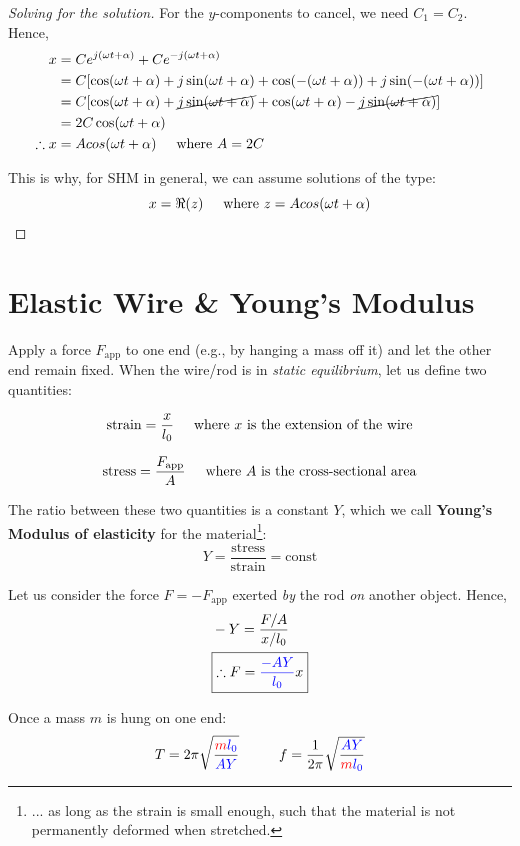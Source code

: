 \documentclass[11pt,letterpaper,titlepage,oneside]{book}
\newcommand{\htab}{\hspace{0.5cm}}
\newcommand{\where}{\htab\text{where }}
\begin{document}
\begin{proof}[Solving for the solution]
For the $y$-components to cancel, we need $C_1=C_2$. Hence,
\begin{align*}
x
&=Ce^{j(\omega t +\alpha)} + Ce^{-j(\omega t +\alpha)} \\
&=C[\cos(\omega t + \alpha) + j\sin(\omega t + \alpha) + \cos(-(\omega t + \alpha)) + j\sin(-(\omega t + \alpha))] \\
&=C[\cos(\omega t + \alpha) + \cancel{j\sin(\omega t + \alpha)} + \cos(\omega t + \alpha) - \cancel{j\sin(\omega t + \alpha)}] \\
&= 2C\cos(\omega t + \alpha) \\
\therefore
x &= Acos(\omega t + \alpha) \where A=2C
\end{align*}

This is why, for SHM in general, we can assume solutions of the type:
\begin{equation}
	x=\Re(z) \where z=Acos(\omega t + \alpha)
\end{equation}
\end{proof}


\section{Elastic Wire \& Young's Modulus}

Apply a force $F_\text{app}$ to one end (e.g., by hanging a mass off it) and let the other end remain fixed. When the wire/rod is in \textit{static equilibrium}, let us define two quantities:

\[  \text{strain} = \frac{x}{l_0} \where\text{$x$ is the extension of the wire}  \]

\[ \text{stress} = \frac{F_\text{app}}{A} \where\text{$A$ is the cross-sectional area} \]

The ratio between these two quantities is a constant $Y$, which we call \textbf{Young's Modulus of elasticity} for the material\footnote{... as long as the strain is small enough, such that the material is not permanently deformed when stretched.}:
\[\boxed{ Y = \frac{\text{stress}}{\text{strain}} = \text{const} } \]

Let us consider the force $F = -F_\text{app}$ exerted \emph{by} the rod \emph{on} another object. Hence,
\begin{align*}
	& -Y = \frac{F/A}{x/l_0} \\
	& \boxed{\therefore F = \textcolor{blue}{\frac{-AY}{l_0}} x \label{youngs_F}}
\end{align*}


Once a mass $m$ is hung on one end:
\[ T = 2\pi\sqrt{\frac{\color{red} m \color{blue}l_0}{\color{blue} AY}} \htab\htab
f =\frac{1}{2\pi} \sqrt{\frac{\color{blue} AY}{\color{red} m \color{blue}l_0}} \]
\end{document}
